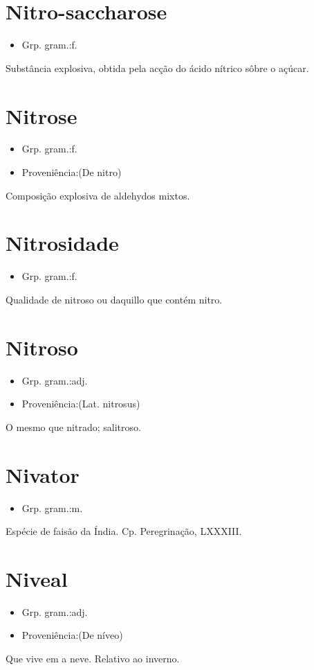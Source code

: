 \section{Nitro-saccharose}
\begin{itemize}
\item {Grp. gram.:f.}
\end{itemize}
Substância explosiva, obtida pela acção do ácido nítrico sôbre o açúcar.
\section{Nitrose}
\begin{itemize}
\item {Grp. gram.:f.}
\end{itemize}
\begin{itemize}
\item {Proveniência:(De \textunderscore nitro\textunderscore )}
\end{itemize}
Composição explosiva de aldehydos mixtos.
\section{Nitrosidade}
\begin{itemize}
\item {Grp. gram.:f.}
\end{itemize}
Qualidade de nitroso ou daquillo que contém nitro.
\section{Nitroso}
\begin{itemize}
\item {Grp. gram.:adj.}
\end{itemize}
\begin{itemize}
\item {Proveniência:(Lat. \textunderscore nitrosus\textunderscore )}
\end{itemize}
O mesmo que \textunderscore nitrado\textunderscore ; salitroso.
\section{Nivator}
\begin{itemize}
\item {Grp. gram.:m.}
\end{itemize}
Espécie de faisão da Índia. Cp. \textunderscore Peregrinação\textunderscore , LXXXIII.
\section{Niveal}
\begin{itemize}
\item {Grp. gram.:adj.}
\end{itemize}
\begin{itemize}
\item {Proveniência:(De \textunderscore níveo\textunderscore )}
\end{itemize}
Que vive em a neve.
Relativo ao inverno.
